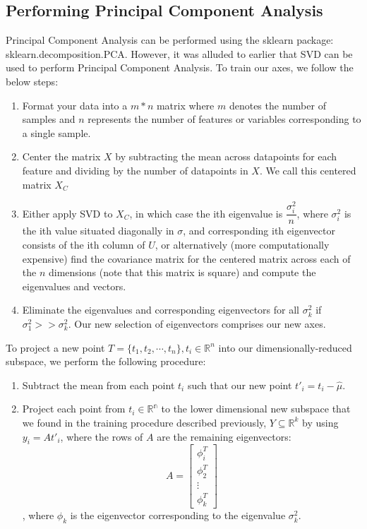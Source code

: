 \documentclass{article}
\begin{document}
\subsection{Performing Principal Component Analysis}
Principal Component Analysis can be performed using the sklearn package:
sklearn.decomposition.PCA. However, it was alluded to earlier that SVD can be used to perform Principal Component Analysis.
To train our axes, we follow the below steps:
\begin{enumerate}
\item Format your data into a $m * n$ matrix where $m$ denotes the number of samples and $n$ represents the number of features or variables corresponding to a single sample.
\item Center the matrix $X$ by subtracting the mean across datapoints for each feature and dividing by the number of datapoints in $X$. We call this centered matrix $X_C$
\item Either apply SVD to $X_C$, in which case the ith eigenvalue is $\dfrac{\sigma_i^2}{n}$, where $\sigma_i^2$ is the ith value situated diagonally in $\sigma$, and corresponding ith eigenvector consists of the ith column of $U$, or alternatively (more computationally expensive) find the covariance matrix for the centered matrix across each of the $n$ dimensions (note that this matrix is square) and compute the eigenvalues and vectors.
\item Eliminate the eigenvalues and corresponding eigenvectors for all $\sigma_k^2$ if $\sigma_1^2>> \sigma_k^2$. Our new selection of eigenvectors comprises our new axes.
\end{enumerate}

To project a new point $T = \{t_1, t_2, \cdots, t_n\}, t_i \in \mathbb{R}^n$ into our dimensionally-reduced subspace, we perform the following procedure:
\begin{enumerate}
    \item Subtract the mean from each point $t_i$ such that our new point $t'_i = t_i-\hat{\mu}$.
    \item Project each point from $t_i \in \mathbb{R^n}$ to the lower dimensional new subspace that we found in the training procedure described previously, $Y \subseteq \mathbb{R}^k$ by using $y_i = At'_i$, where the rows of $A$ are the remaining eigenvectors:
    \[ A = \begin{bmatrix}
        \phi_i^T\\
        \phi_2^T\\
        \vdots \\
        \phi_k^T
    \end{bmatrix}\], where $\phi_k$ is the eigenvector corresponding to the eigenvalue $\sigma_k^2$.
\end{enumerate}
\end{document}
